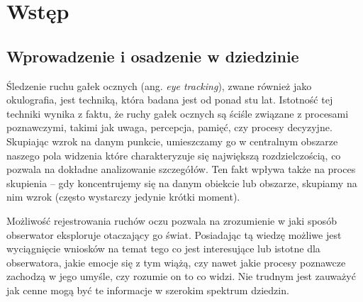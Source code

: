 \documentclass[a4paper,twoside,12pt]{book}
\newcommand{\obcy}[1]{\emph{#1}}
\newcommand{\english}[1]{{\selectlanguage{british}\obcy{#1}}}
\newcounter{stronyPozaNumeracja}
\begin{document}
\setcounter{stronyPozaNumeracja}{\value{page}}
\mainmatter
\pagestyle{empty}

\cleardoublepage

\pagestyle{NumeryStronNazwyRozdzialow}


%
%
%
\chapter{Wstęp}
\label{ch:wstep}

\section{Wprowadzenie i osadzenie w dziedzinie}
\label{sec:wprowadzenie-i-osadzenie-w-dziedzinie}
Śledzenie ruchu gałek ocznych (ang. \english{eye tracking}), zwane również jako okulografia, jest techniką, która badana jest od ponad stu lat. Istotność tej techniki wynika z faktu, że ruchy gałek ocznych są ściśle związane z procesami poznawczymi, takimi jak uwaga, percepcja, pamięć, czy procesy decyzyjne. Skupiając wzrok na danym punkcie, umieszczamy go w centralnym obszarze naszego pola widzenia które charakteryzuje się największą rozdzielczością, co pozwala na dokładne analizowanie szczegółów. Ten fakt wpływa także na proces skupienia -- gdy koncentrujemy się na danym obiekcie lub obszarze, skupiamy na nim wzrok (często wystarczy jedynie krótki moment).

Możliwość rejestrowania ruchów oczu pozwala na zrozumienie w jaki sposób obserwator eksploruje otaczający go świat. Posiadając tą wiedzę możliwe jest wyciągnięcie wniosków na temat tego co jest interesujące lub istotne dla obserwatora, jakie emocje się z tym wiążą, czy nawet jakie procesy poznawcze zachodzą w jego umyśle, czy rozumie on to co widzi. Nie trudnym jest zauważyć jak cenne mogą być te informacje w szerokim spektrum dziedzin.
\end{document}
